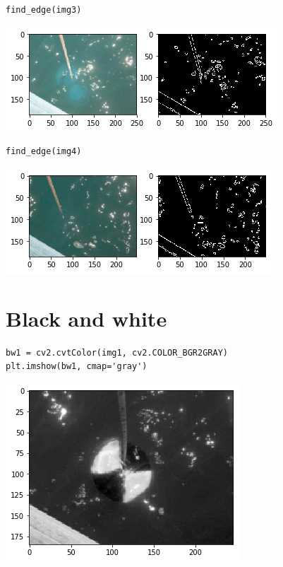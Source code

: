 \begin{verbatim}
find_edge(img3)
\end{verbatim}

\includegraphics{secchi-a/output_21_0.png}

\begin{verbatim}
find_edge(img4)
\end{verbatim}

\includegraphics{secchi-a/output_22_0.png}

\section{Black and white}\label{black-and-white}

\begin{verbatim}
bw1 = cv2.cvtColor(img1, cv2.COLOR_BGR2GRAY)
plt.imshow(bw1, cmap='gray')
\end{verbatim}

\includegraphics{secchi-a/output_26_1.png}
